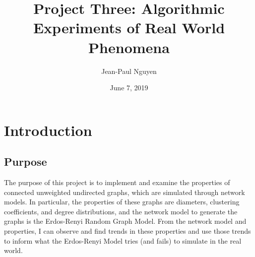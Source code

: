 \documentclass{article}
\title{Project Three: Algorithmic Experiments of Real World Phenomena}
\author{Jean-Paul Nguyen}
\date{June 7, 2019}
\begin{document}
\maketitle

\newcommand{\nextblurb}[0]{\vspace{1 em} \newline \noindent}

\section{Introduction}
\subsection{Purpose}
    The purpose of this project is to implement and examine the properties of
    connected unweighted undirected graphs, which are simulated through
    network models. In particular, the properties of these graphs are
    diameters, clustering coefficients, and degree distributions, and the 
    network model to generate the graphs is the Erdos-Renyi Random Graph Model.
    From the network model and properties, I can observe and find trends in
    these properties and use those trends to inform what the Erdos-Renyi Model
    tries (and fails) to simulate in the real world.
\end{document}
